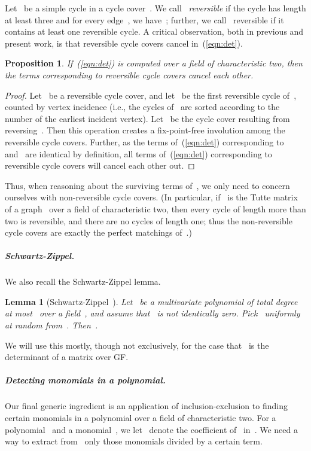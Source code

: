 \documentclass[a4paper,11pt]{article}
\newtheorem{proposition}{\textbf{Proposition}}
\newtheorem{lemma}{Lemma}
\begin{document}
Let~ be a simple cycle in a cycle cover~. We call~ \emph{reversible} if
the cycle has length at least three and for every edge~, we
have~; further, we call~ reversible if it contains at least one
reversible cycle. A critical observation, both in previous and present work, is that
reversible cycle covers cancel in~(\ref{eqn:det}).

\begin{proposition}
\label{prop:reverse}
If~(\ref{eqn:det}) is computed over a field of characteristic two, then the terms
corresponding to reversible cycle covers cancel each other. 
\end{proposition}
\begin{proof}
Let~ be a reversible cycle cover, and let~ be the first reversible cycle
of~, counted by vertex incidence (i.e., the cycles of~ are sorted
according to the number of the earliest incident vertex). 
Let~ be the cycle cover resulting from reversing~. Then this
operation creates a fix-point-free involution among the reversible cycle covers. Further,
as the terms of~(\ref{eqn:det}) corresponding to~ and~ are identical by
definition, all terms of~(\ref{eqn:det}) corresponding to reversible cycle covers will
cancel each other out. 
\end{proof}

Thus, when reasoning about the surviving terms of~, we only need to concern
ourselves with non-reversible cycle covers. (In particular, if~ is the Tutte matrix
of a graph~ over a field of characteristic two, then every cycle of length more than
two is reversible, and there are no cycles of length one; thus the non-reversible cycle
covers are exactly the perfect matchings of~.) 

\subparagraph*{Schwartz-Zippel.} 
We also recall the Schwartz-Zippel lemma. 

\begin{lemma}[Schwartz-Zippel~\cite{Schwartz80,Zippel79}] Let~ be a multivariate polynomial of
  total degree at most~ over a field~, and assume that~ is not identically zero. 
  Pick~ uniformly at random from~. Then~. 
\end{lemma}

We will use this mostly, though not exclusively, for the case that~ is the determinant
of a matrix over GF. 

\subparagraph*{Detecting monomials in a polynomial.}
Our final generic ingredient is an application of inclusion-exclusion to finding certain
monomials in a polynomial over a field of characteristic two. For a polynomial~ and a
monomial~, we let~ denote the coefficient of~ in~. We need a way to extract
from~ only those monomials divided by a certain term. 
\end{document}
